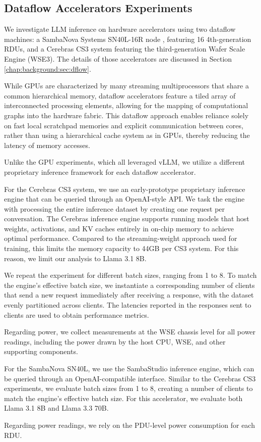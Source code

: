 \subsection{Dataflow Accelerators Experiments}
\label{chap:methods:sec:dsa}

We investigate LLM inference on hardware accelerators using two dataflow machines: a SambaNova Systems SN40L-16R node \cite{Prabhakar2024}, featuring 16 4th-generation RDUs, and a Cerebras CS3 system \cite{Lie2023} featuring the third-generation Wafer Scale Engine (WSE3). The details of those accelerators are discussed in Section \ref{chap:background:sec:dflow}.

While GPUs are characterized by many streaming multiprocessors that share a common hierarchical memory, dataflow accelerators feature a tiled array of interconnected processing elements, allowing for the mapping of computational graphs into the hardware fabric. This dataflow approach enables reliance solely on fast local scratchpad memories and explicit communication between cores, rather than using a hierarchical cache system as in GPUs, thereby reducing the latency of memory accesses.

Unlike the GPU experiments, which all leveraged vLLM, we utilize a different proprietary inference framework for each dataflow accelerator.

For the Cerebras CS3 system, we use an early-prototype proprietary inference engine that can be queried through an OpenAI-style API.
We task the engine with processing the entire inference dataset by creating one request per conversation.
The Cerebras inference engine supports running models that host weights, activations, and KV caches entirely in on-chip memory to achieve optimal performance. Compared to the streaming-weight approach used for training, this limits the memory capacity to 44GB per CS3 system. For this reason, we limit our analysis to  Llama 3.1 8B.

We repeat the experiment for different batch sizes, ranging from 1 to 8.
To match the engine's effective batch size, we instantiate a corresponding number of clients that send a new request immediately after receiving a response, with the dataset evenly partitioned across clients.
The latencies reported in the responses sent to clients are used to obtain performance metrics.

Regarding power, we collect measurements at the WSE chassis level for all power readings, including the power drawn by the host CPU, WSE, and other supporting components.

For the SambaNova SN40L, we use the SambaStudio inference engine, which can be queried through an OpenAI-compatible interface. Similar to the Cerebras CS3 experiments, we evaluate batch sizes from 1 to 8, creating a number of clients to match the engine's effective batch size.
For this accelerator, we evaluate both Llama 3.1 8B and Llama 3.3 70B.

Regarding power readings, we rely on the PDU-level power consumption for each RDU.
